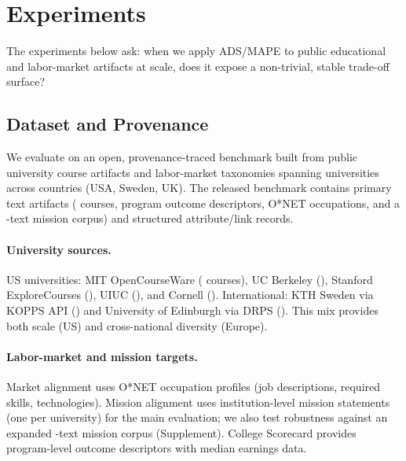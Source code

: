 \documentclass[sigconf,review]{acmart}
\newcommand{\ADS}{\textsc{ADS}\xspace}
\newcommand{\MAPE}{\textsc{MAPE}\xspace}
\begin{document}
\section{Experiments}
\label{sec:experiments}

The experiments below ask: when we apply \ADS/\MAPE to public educational and labor-market artifacts at scale, does it expose a non-trivial, stable trade-off surface?

\subsection{Dataset and Provenance}
\label{subsec:data}

We evaluate on an open, provenance-traced benchmark built from public university course artifacts and labor-market taxonomies spanning {\NumUniversities} universities across {\NumCountries} countries (USA, Sweden, UK). The released benchmark contains {\NumPrimaryArtifacts} primary text artifacts ({\NumCourses} courses, {\NumPrograms} program outcome descriptors, {\NumOccupations} O*NET occupations, and a {\NumMissionsExpanded}-text mission corpus) and {\NumAttributeRecords} structured attribute/link records.

\paragraph{University sources.}
US universities: MIT OpenCourseWare ({\NumMIT} courses), UC Berkeley ({\NumUCB}), Stanford ExploreCourses ({\NumStanford}), UIUC ({\NumUIUC}), and Cornell ({\NumCornell}). International: KTH Sweden via KOPPS API ({\NumKTH}) and University of Edinburgh via DRPS ({\NumEdinburgh}). This mix provides both scale (US) and cross-national diversity (Europe).

\paragraph{Labor-market and mission targets.}
Market alignment uses {\NumOccupations} O*NET occupation profiles (job descriptions, required skills, technologies). Mission alignment uses {\NumMissionsMain} institution-level mission statements (one per university) for the main evaluation; we also test robustness against an expanded {\NumMissionsExpanded}-text mission corpus (Supplement). College Scorecard provides {\NumScorecardPrograms} program-level outcome descriptors with median earnings data.


\end{document}
